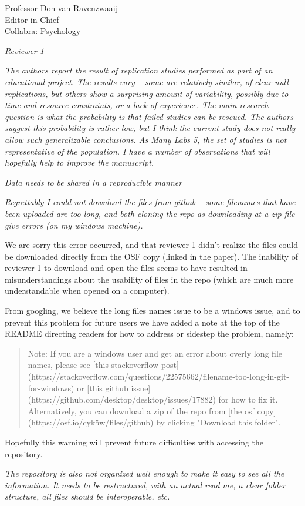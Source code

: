 \documentclass{stanfordletter}
\newcommand{\theysaid}[1]{\begin{leftbar} \noindent 
		\textsl{ #1}\end{leftbar}}
\newcommand{\revised}[1]{\begin{quote}	#1 \end{quote}}
\begin{document}
\begin{letter}{Professor Don van Ravenzwaaij \\ Editor-in-Chief \\ Collabra: Psychology }
		
		\theysaid{Reviewer 1}

		
		\theysaid{The authors report the result of replication studies performed as part of an educational project. The results vary – some are relatively similar, of clear null replications, but others show a surprising amount of variability, possibly due to time and resource constraints, or a lack of experience. The main research question is what the probability is that failed studies can be rescued. The authors suggest this probability is rather low, but I think the current study does not really allow such generalizable conclusions. As Many Labs 5, the set of studies is not representative of the population. I have a number of observations that will hopefully help to improve the manuscript.}
		
		\theysaid{Data needs to be shared in a reproducible manner}
		\theysaid{Regrettably I could not download the files from github – some filenames that have been uploaded are too long, and both cloning the repo as downloading at a zip file give errors (on my windows machine). }
		
		We are sorry this error occurred, and that reviewer 1 didn't realize the files could be downloaded directly from the OSF copy (linked in the paper).  The inability of reviewer 1 to download and open the files seems to have resulted in misunderstandings about the usability of files in the repo (which are much more understandable when opened on a computer).
		
		From googling, we believe the long files names issue to be a windows issue, and to prevent this problem for future users we have added a note at the top of the README directing readers for how to address or sidestep the problem, namely:
		
		\revised{Note: If you are a windows user and get an error about overly long file names, please see [this stackoverflow post] (https://stackoverflow.com/questions/22575662/filename-too-long-in-git-for-windows) or [this github issue] (https://github.com/desktop/desktop/issues/17882) for how to fix it. Alternatively, you can download a zip of the repo from [the osf copy] (https://osf.io/cyk5w/files/github) by clicking "Download this folder".}
		
		Hopefully this warning will prevent future difficulties with accessing the repository. 
		
		\theysaid{The repository is also not organized well enough to make it easy to see all the information. It needs to be restructured, with an actual read me, a clear folder structure, all files should be interoperable, etc. 
		}
		

\end{letter}
\end{document}
